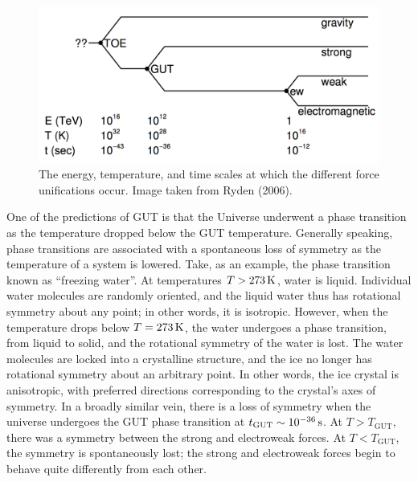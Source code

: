 \documentclass[a4paper,11pt]{article}
\begin{document}
\begin{figure}[h]
    \includegraphics[width=16cm]{figures/GUT.png}
    \centering
    \caption{\footnotesize{The energy, temperature, and time scales at which the different force unifications occur. Image taken from Ryden (2006).}}
    \label{fig:gut}
\end{figure}

{\noindent}One of the predictions of GUT is that the Universe underwent a phase transition as the temperature dropped below the GUT temperature. Generally speaking, phase transitions are associated with a spontaneous loss of symmetry as the temperature of a system is lowered. Take, as an example, the phase transition known as ``freezing water''. At temperatures $T>273\,{\rm K}$, water is liquid. Individual water molecules are randomly oriented, and the liquid water thus has rotational symmetry about any point; in other words, it is isotropic. However, when the temperature drops below $T=273\,{\rm K}$, the water undergoes a phase transition, from liquid to solid, and the rotational symmetry of the water is lost. The water molecules are locked into a crystalline structure, and the ice no longer has rotational symmetry about an arbitrary point. In other words, the ice crystal is anisotropic, with preferred directions corresponding to the crystal’s axes of symmetry. In a broadly similar vein, there is a loss of symmetry when the universe undergoes the GUT phase transition at $t_\mathrm{GUT}\sim10^{-36}\,{\rm s}$. At $T>T_\mathrm{GUT}$, there was a symmetry between the strong and electroweak forces. At $T<T_\mathrm{GUT}$, the symmetry is spontaneously lost; the strong and electroweak forces begin to behave quite differently from each other.
\end{document}
